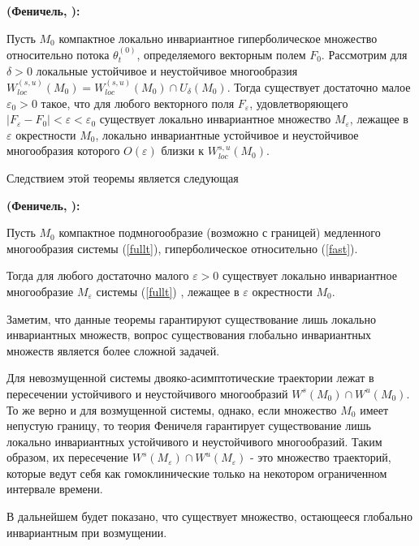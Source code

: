 \begin{thm}
\textbf{(Феничель, \cite{fenichel}):}

Пусть $M_0$ компактное локально инвариантное гиперболическое множество относительно потока $\theta_{t}^{(0)}$, определяемого векторным полем $F_{0}$. Рассмотрим для $\delta>0$ локальные устойчивое и неустойчивое многообразия $W_{loc}^{(s,u)}(M_0) = W_{loc}^{(s,u)}(M_0)\cap U_{\delta}(M_0)$.
Тогда существует достаточно малое $\varepsilon_{0} > 0$ такое, что для любого векторного поля $F_{\varepsilon}$, удовлетворяющего $\vert F_{\varepsilon} - F_{0}\vert < \varepsilon < \varepsilon_{0}$ существует локально инвариантное множество $M_{\varepsilon}$, лежащее в $\varepsilon$ окрестности $M_0$, локально инвариантные устойчивое и неустойчивое многообразия которого $O(\varepsilon)$ близки к 
$W_{loc}^{s,u}(M_0)$.
\end{thm}

Следствием этой теоремы является следующая
\begin{thm}
\textbf{(Феничель, \cite{jones}):}

Пусть $M_0$ компактное подмногообразие (возможно с границей) медленного многообразия системы (\ref{fullt}), гиперболическое относительно (\ref{fast}).

Тогда для любого достаточно малого $\varepsilon > 0$ существует локально инвариантное многообразие $M_{\varepsilon}$ системы (\ref{fullt}) , лежащее в 
$\varepsilon$ окрестности $M_0$.
\end{thm}

Заметим, что данные теоремы гарантируют существование лишь локально инвариантных множеств, вопрос существования глобально инвариантных множеств является более сложной задачей.

Для невозмущенной системы двояко-асимптотические траектории лежат в пересечении устойчивого и неустойчивого многообразий $W^s(M_0) \cap W^u(M_0)$. То же верно и для возмущенной системы, однако, если множество $M_{0}$ имеет непустую границу, то теория Феничеля гарантирует существование лишь локально инвариантных устойчивого и неустойчивого многообразий. Таким образом, их пересечение $W^s(M_\varepsilon) \cap W^u(M_\varepsilon)$ - это множество траекторий, которые ведут себя как гомоклинические только на некотором ограниченном интервале времени.

В дальнейшем будет показано, что существует множество, остающееся глобально инвариантным при возмущении.

